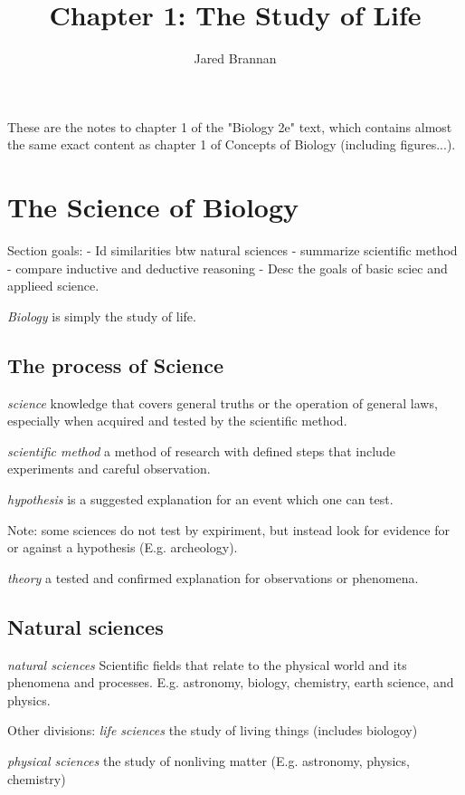 \documentclass{article}
\title{Chapter 1: The Study of Life}
\author{Jared Brannan }
\theoremstyle{definition}
\begin{document}
\maketitle

These are the notes to chapter 1 of the "Biology 2e" text, which contains almost the same exact content as chapter 1 of Concepts of Biology (including figures...).

\section{The Science of Biology}

Section goals:
- Id similarities btw natural sciences
- summarize scientific method
- compare inductive and deductive reasoning
- Desc the goals of basic sciec and applieed science.

 \textit{Biology} is simply the study of life.

\subsection{The process of Science}

 \textit{science}
knowledge that covers general truths or the operation of general laws, especially when acquired and tested by the scientific method.

 \textit{scientific method}
a method of research with defined steps that include experiments and careful observation.

 \textit{hypothesis}
is a suggested explanation for an event which one can test.

Note: some sciences do not test by expiriment, but instead look for evidence for or against a hypothesis (E.g. archeology).

 \textit{theory}
a tested and confirmed explanation for observations or phenomena.

\subsection{Natural sciences}
 \textit{natural sciences}
Scientific fields that relate to the physical world and its phenomena and processes.
E.g.  astronomy, biology, chemistry, earth science, and physics.

Other divisions:
 \textit{life sciences}
the study of living things (includes biologoy)

 \textit{physical sciences}
the study of nonliving matter (E.g. astronomy, physics, chemistry)
\end{document}
